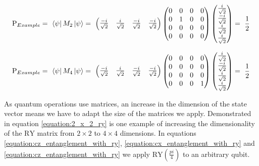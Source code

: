 \begin{equation}
    \centering
    \begin{split}
        \mathrm{P}_{Example} =\ \bra{\psi}M_2\ket{\psi} =\ \begin{pmatrix}
        \frac{-i}{\sqrt{2}} & \frac{i}{\sqrt{2}} & \frac{-i}{\sqrt{2}} & \frac{-i}{\sqrt{2}}
        \end{pmatrix}\begin{pmatrix}
        0 & 0 & 0 & 0 \\ 
        0 & 1 & 0 & 0 \\ 
        0 & 0 & 0 & 0\\ 
        0 & 0 & 0& 0\end{pmatrix}\begin{pmatrix}
        \frac{i}{\sqrt{2}} \\ \frac{-i}{\sqrt{2}} \\ \frac{i}{\sqrt{2}} \\ \frac{i}{\sqrt{2}}
        \end{pmatrix} =\ \frac{1}{2}
    \end{split}
    \label{equation:probability_calculation_example_1}
\end{equation}

\begin{equation}
    \centering
    \begin{split}
        \mathrm{P}_{Example} =\ \bra{\psi}M_4\ket{\psi} =\ \begin{pmatrix}
        \frac{-i}{\sqrt{2}} & \frac{i}{\sqrt{2}} & \frac{-i}{\sqrt{2}} & \frac{-i}{\sqrt{2}}
        \end{pmatrix}\begin{pmatrix}
        0 & 0 & 0 & 0 \\ 
        0 & 0 & 0 & 0 \\ 
        0 & 0 & 0 & 0\\ 
        0 & 0 & 0& 1\end{pmatrix}\begin{pmatrix}
        \frac{i}{\sqrt{2}} \\ \frac{-i}{\sqrt{2}} \\ \frac{i}{\sqrt{2}} \\ \frac{i}{\sqrt{2}}
        \end{pmatrix} =\ \frac{1}{2}
    \end{split}
    \label{equation:probability_calculation_example_2}
\end{equation}

 As quantum operations use matrices, an increase in the dimension of the state vector means we have to adapt the size of the matrices we apply. Demonstrated in equation \ref{equation:2_x_2_ry} is one example of increasing the dimensionality of the $\mathrm{RY}$ matrix from $2\times2$ to $4\times4$ dimensions. In equations \ref{equation:cz_entanglement_with_ry}, \ref{equation:cx_entanglement_with_ry} and \ref{equation:cz_entanglement_with_ry} we apply $\mathrm{RY}\left(\frac{pi}{4}\right)$ to an arbitrary qubit.

